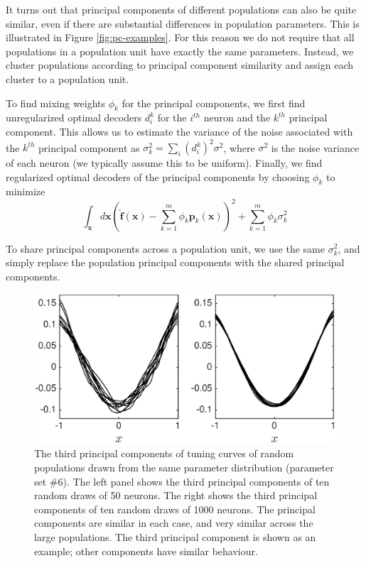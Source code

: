 \documentclass[]{article}
\begin{document}
It turns out that principal components of different populations can also be quite similar, even if there are substantial differences in population parameters. This is illustrated in Figure \ref{fig:pc-examples}. For this reason we do not require that all populations in a population unit have exactly the same parameters. Instead, we cluster populations according to principal component similarity and assign each cluster to a population unit.   

To find mixing weights $\phi_k$ for the principal components, we first find unregularized optimal decoders $d_i^k$ for the $i^{th}$ neuron and the $k^{th}$ principal component. This allows us to estimate the variance of the noise associated with the $k^{th}$ principal component as $\sigma_k^2 = \sum_i (d_i^k)^2 \sigma^2$, where $\sigma^2$ is the noise variance of each neuron (we typically assume this to be uniform). Finally, we find regularized optimal decoders of the principal components by choosing $\phi_k$ to minimize
\begin{equation}
\int_{\mathbf{x}} d\mathbf{x} \left( \hat{\mathbf{f}}(\mathbf{x}) -  \sum_{k=1}^m \phi_k \mathbf{p}_k(\mathbf{x}) \right)^2 + \sum_{k=1}^m \phi_k \sigma_k^2
\end{equation} 

To share principal components across a population unit, we use the same $\sigma_k^2$, and simply replace the population principal components with the shared principal components. 

\begin{figure}
\centering{}
\includegraphics[scale=0.4]{PC3.eps}
\caption{The third principal components of tuning curves of random populations drawn from the same parameter distribution (parameter set \#6). The left panel shows the third principal components of ten random draws of 50 neurons. The right shows the third principal components of ten random draws of 1000 neurons. The principal components are similar in each case, and very similar across the large populations. The third principal component is shown as an example; other components have similar behaviour.}
\label{fig:pc3}
\end{figure}
\end{document}

